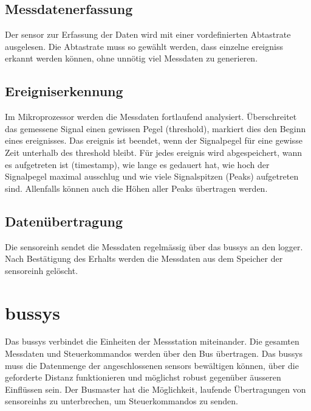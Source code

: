 \subsection{Messdatenerfassung}
Der \gls{sensor} zur Erfassung der Daten wird mit einer vordefinierten Abtastrate ausgelesen. Die Abtastrate muss so gewählt werden, dass einzelne \glspl{ereignis} erkannt werden können, ohne unnötig viel Messdaten zu generieren.

\subsection{Ereigniserkennung}
Im Mikroprozessor werden die Messdaten fortlaufend analysiert. Überschreitet das gemessene Signal einen gewissen Pegel (\gls{threshold}), markiert dies den Beginn eines \gls{ereignis}ses. Das \gls{ereignis} ist beendet, wenn der Signalpegel für eine gewisse Zeit unterhalb des \gls{threshold} bleibt. Für jedes \gls{ereignis} wird abgespeichert, wann es aufgetreten ist (\gls{timestamp}), wie lange es gedauert hat, wie hoch der Signalpegel maximal ausschlug und wie viele Signalspitzen (Peaks) aufgetreten sind. Allenfalls können auch die Höhen aller Peaks übertragen werden.

\subsection{Datenübertragung}
Die \gls{sensoreinh} sendet die Messdaten regelmässig über das \gls{bussys} an den \gls{logger}. Nach Bestätigung des Erhalts werden die Messdaten aus dem Speicher der \gls{sensoreinh} gelöscht.

\section{\gls{bussys}}
Das \gls{bussys} verbindet die Einheiten der Messstation miteinander. Die gesamten Messdaten und Steuerkommandos werden über den Bus übertragen. Das \gls{bussys} muss die Datenmenge der angeschlossenen \glspl{sensor} bewältigen können, über die geforderte Distanz funktionieren und möglichst robust gegenüber äusseren Einflüssen sein. Der Busmaster hat die Möglichkeit, laufende Übertragungen von \glspl{sensoreinh} zu unterbrechen, um Steuerkommandos zu senden.